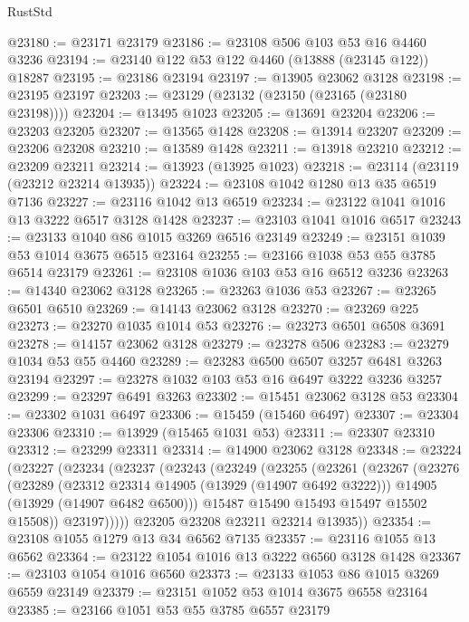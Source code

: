 \begin{lexlean}{RustStd}
\begin{coremodule}
@23180 := @23171 @23179
@23186 := @23108 @506 @103 @53 @16 @4460 @3236
@23194 := @23140 @122 @53 @122 @4460 (@13888 (@23145 @122)) @18287
@23195 := @23186 @23194
@23197 := @13905 @23062 @3128
@23198 := @23195 @23197
@23203 := @23129 (@23132 (@23150 (@23165 (@23180 @23198))))
@23204 := @13495 @1023
@23205 := @13691 @23204
@23206 := @23203 @23205
@23207 := @13565 @1428
@23208 := @13914 @23207
@23209 := @23206 @23208
@23210 := @13589 @1428
@23211 := @13918 @23210
@23212 := @23209 @23211
@23214 := @13923 (@13925 @1023)
@23218 := @23114 (@23119 (@23212 @23214 @13935))
@23224 := @23108 @1042 @1280 @13 @35 @6519 @7136
@23227 := @23116 @1042 @13 @6519
@23234 := @23122 @1041 @1016 @13 @3222 @6517 @3128 @1428
@23237 := @23103 @1041 @1016 @6517
@23243 := @23133 @1040 @86 @1015 @3269 @6516 @23149
@23249 := @23151 @1039 @53 @1014 @3675 @6515 @23164
@23255 := @23166 @1038 @53 @55 @3785 @6514 @23179
@23261 := @23108 @1036 @103 @53 @16 @6512 @3236
@23263 := @14340 @23062 @3128
@23265 := @23263 @1036 @53
@23267 := @23265 @6501 @6510
@23269 := @14143 @23062 @3128
@23270 := @23269 @225
@23273 := @23270 @1035 @1014 @53
@23276 := @23273 @6501 @6508 @3691
@23278 := @14157 @23062 @3128
@23279 := @23278 @506
@23283 := @23279 @1034 @53 @55 @4460
@23289 := @23283 @6500 @6507 @3257 @6481 @3263 @23194
@23297 := @23278 @1032 @103 @53 @16 @6497 @3222 @3236 @3257
@23299 := @23297 @6491 @3263
@23302 := @15451 @23062 @3128 @53
@23304 := @23302 @1031 @6497
@23306 := @15459 (@15460 @6497)
@23307 := @23304 @23306
@23310 := @13929 (@15465 @1031 @53)
@23311 := @23307 @23310
@23312 := @23299 @23311
@23314 := @14900 @23062 @3128
@23348 := @23224
    (@23227
      (@23234
        (@23237
          (@23243
            (@23249
              (@23255
                (@23261
                  (@23267
                    (@23276
                      (@23289
                        (@23312 @23314 @14905 (@13929 (@14907 @6492 @3222)))
                        @14905
                        (@13929 (@14907 @6482 @6500)))
                      @15487
                      @15490
                      @15493
                      @15497
                      @15502
                      @15508))
                  @23197)))))
        @23205
        @23208
        @23211
        @23214
        @13935))
@23354 := @23108 @1055 @1279 @13 @34 @6562 @7135
@23357 := @23116 @1055 @13 @6562
@23364 := @23122 @1054 @1016 @13 @3222 @6560 @3128 @1428
@23367 := @23103 @1054 @1016 @6560
@23373 := @23133 @1053 @86 @1015 @3269 @6559 @23149
@23379 := @23151 @1052 @53 @1014 @3675 @6558 @23164
@23385 := @23166 @1051 @53 @55 @3785 @6557 @23179

\end{coremodule}
\end{lexlean}
